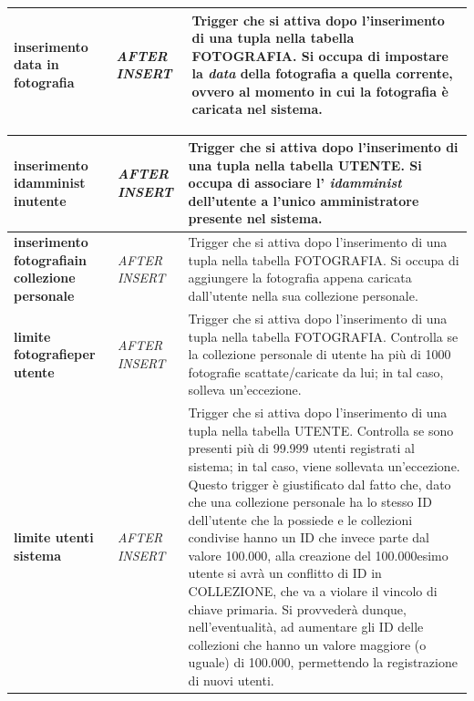 \documentclass[a4paper]{article}
\begin{document}
\begin{tabular}{p{130pt}p{130pt}p{145pt}}
		\textbf{inserimento\textunderscore
		data \newline in\textunderscore
		fotografia} & 
		\emph{AFTER INSERT} & 
		Trigger che si attiva dopo l'inserimento di una
		tupla
		nella tabella FOTOGRAFIA. Si occupa di impostare la
		\emph{data} della fotografia a quella corrente,
		ovvero al momento in cui la fotografia è caricata nel
		sistema.
		\\
		\hline
		

	\end{tabular}
	\newpage
	
	\begin{tabular}{p{130pt}p{130pt}p{145pt}}
		\textbf{inserimento\textunderscore
		id\newline amminist\textunderscore
		in\textunderscore utente} & 
		\emph{AFTER INSERT} & 
		Trigger che si attiva dopo l'inserimento di una
		tupla
		nella tabella UTENTE. Si occupa di associare l'
		\emph{id\textunderscore amminist} dell'utente a
		l'unico amministratore presente nel sistema.
		\\
		\hline
		
		\textbf{inserimento\textunderscore
		fotografia\newline in\textunderscore
		collezione\textunderscore
		personale} & 
		\emph{AFTER INSERT} & 
		Trigger che si attiva dopo l'inserimento di una
		tupla
		nella tabella FOTOGRAFIA. Si occupa di aggiungere la
		fotografia appena caricata dall'utente nella sua
		collezione personale.
		\\
		\hline
		
		\textbf{limite\textunderscore
		fotografie\newline per\textunderscore
		utente} & 
		\emph{AFTER INSERT} & 
		Trigger che si attiva dopo l'inserimento di una
		tupla
		nella tabella FOTOGRAFIA. Controlla se la collezione
		personale di utente ha più di 1000 fotografie
		scattate/caricate da lui; in tal caso, solleva
		un'eccezione.
		\\
		\hline
		
		\textbf{limite\textunderscore
		utenti\newline
		sistema} & 
		\emph{AFTER INSERT} & 
		Trigger che si attiva dopo l'inserimento di una
		tupla
		nella tabella UTENTE. Controlla se sono presenti più
		di 99.999 utenti registrati al sistema; in tal caso,
		viene sollevata un'eccezione. Questo trigger è
		giustificato dal fatto che, dato che una collezione
		personale ha lo stesso ID dell'utente che la possiede
		e le collezioni condivise hanno un ID che invece
		parte dal valore 100.000, alla creazione del
		100.000esimo utente si avrà un conflitto di ID in
		COLLEZIONE, che va a violare il vincolo di chiave
		primaria. Si provvederà dunque, nell'eventualità, ad
		aumentare gli ID delle collezioni che hanno un valore
		maggiore (o uguale) di 100.000, permettendo la
		registrazione di nuovi utenti.
		\\
		\hline
	\end{tabular}
\end{document}
